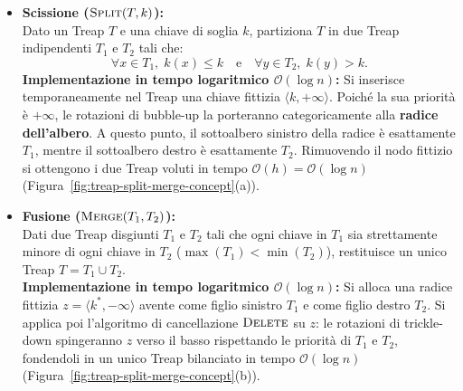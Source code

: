 \begin{itemize}
    \item \textbf{Scissione ($\textsc{Split}(T, k)$):}\\
    Dato un Treap $T$ e una chiave di soglia $k$, partiziona $T$ in due Treap indipendenti $T_1$ e $T_2$ tali che:
    \begin{equation}
      \forall x \in T_1, \; k(x) \le k \quad \text{e} \quad \forall y \in T_2, \; k(y) > k.
    \end{equation}
    \textbf{Implementazione in tempo logaritmico $\mathcal{O}(\log n)$:} Si inserisce temporaneamente nel Treap una chiave fittizia $\langle k, +\infty \rangle$. Poich\'e la sua priorit\`a \`e $+\infty$, le rotazioni di bubble-up la porteranno categoricamente alla \textbf{radice dell'albero}. A questo punto, il sottoalbero sinistro della radice \`e esattamente $T_1$, mentre il sottoalbero destro \`e esattamente $T_2$. Rimuovendo il nodo fittizio si ottengono i due Treap voluti in tempo $\mathcal{O}(h) = \mathcal{O}(\log n)$ (Figura~\ref{fig:treap-split-merge-concept}(a)).

    \item \textbf{Fusione ($\textsc{Merge}(T_1, T_2)$):}\\
    Dati due Treap disgiunti $T_1$ e $T_2$ tali che ogni chiave in $T_1$ sia strettamente minore di ogni chiave in $T_2$ ($\max(T_1) < \min(T_2)$), restituisce un unico Treap $T = T_1 \cup T_2$.\\
    \textbf{Implementazione in tempo logaritmico $\mathcal{O}(\log n)$:} Si alloca una radice fittizia $z = \langle k^*, -\infty \rangle$ avente come figlio sinistro $T_1$ e come figlio destro $T_2$. Si applica poi l'algoritmo di cancellazione $\textsc{Delete}$ su $z$: le rotazioni di trickle-down spingeranno $z$ verso il basso rispettando le priorit\`a di $T_1$ e $T_2$, fondendoli in un unico Treap bilanciato in tempo $\mathcal{O}(\log n)$ (Figura~\ref{fig:treap-split-merge-concept}(b)).
\end{itemize}


